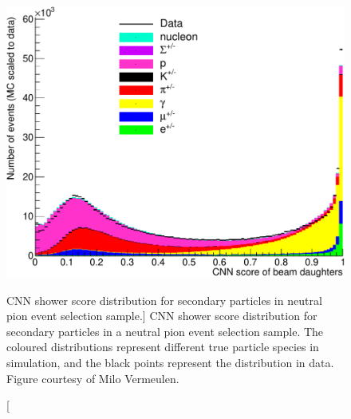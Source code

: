 \begin{figure}
	\centering
	\includegraphics[width=\textwidth]{figures/cnn_pi_0.pdf}
	\caption
	[CNN shower score distribution for secondary particles in neutral pion event
	selection sample.]
	{CNN shower score distribution for secondary particles in a neutral pion event
	selection sample. The coloured distributions represent different true particle
	species in \protodune{} simulation, and the black points represent the
	distribution in \protodune{} data. Figure courtesy of Milo
	Vermeulen\cite{pi_0}.}
	\label{fig:milo_pi0}
\end{figure}
